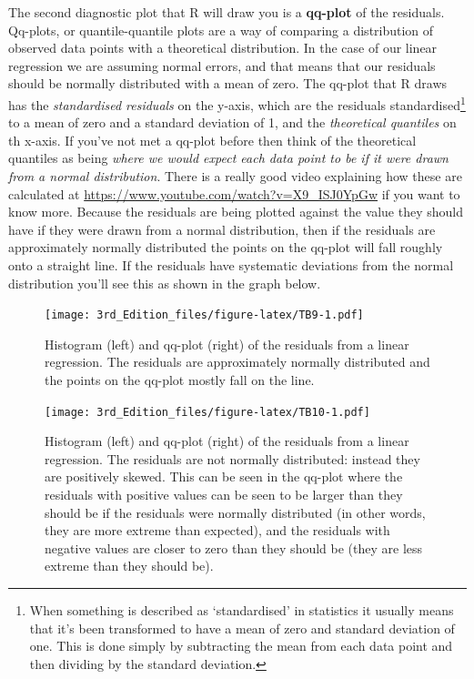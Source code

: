 \documentclass[
]{book}
\begin{document}
The second diagnostic plot that R will draw you is a \textbf{qq-plot} of the residuals. Qq-plots, or quantile-quantile plots are a way of comparing a distribution of observed data points with a theoretical distribution. In the case of our linear regression we are assuming normal errors, and that means that our residuals should be normally distributed with a mean of zero. The qq-plot that R draws has the \emph{standardised residuals} on the y-axis, which are the residuals standardised\footnote{When something is described as `standardised' in statistics it usually means that it's been transformed to have a mean of zero and standard deviation of one. This is done simply by subtracting the mean from each data point and then dividing by the standard deviation.} to a mean of zero and a standard deviation of 1, and the \emph{theoretical quantiles} on th x-axis. If you've not met a qq-plot before then think of the theoretical quantiles as being \emph{where we would expect each data point to be if it were drawn from a normal distribution}. There is a really good video explaining how these are calculated at \url{https://www.youtube.com/watch?v=X9_ISJ0YpGw} if you want to know more. Because the residuals are being plotted against the value they should have if they were drawn from a normal distribution, then if the residuals are approximately normally distributed the points on the qq-plot will fall roughly onto a straight line. If the residuals have systematic deviations from the normal distribution you'll see this as shown in the graph below.

\begin{figure}
\centering
\texttt{[image: 3rd\_Edition\_files/figure-latex/TB9-1.pdf]}
\caption{\label{fig:TB9}Histogram (left) and qq-plot (right) of the residuals from a linear regression. The residuals are approximately normally distributed and the points on the qq-plot mostly fall on the line.}
\end{figure}

\begin{figure}
\centering
\texttt{[image: 3rd\_Edition\_files/figure-latex/TB10-1.pdf]}
\caption{\label{fig:TB10}Histogram (left) and qq-plot (right) of the residuals from a linear regression. The residuals are not normally distributed: instead they are positively skewed. This can be seen in the qq-plot where the residuals with positive values can be seen to be larger than they should be if the residuals were normally distributed (in other words, they are more extreme than expected), and the residuals with negative values are closer to zero than they should be (they are less extreme than they should be).}
\end{figure}
\end{document}
